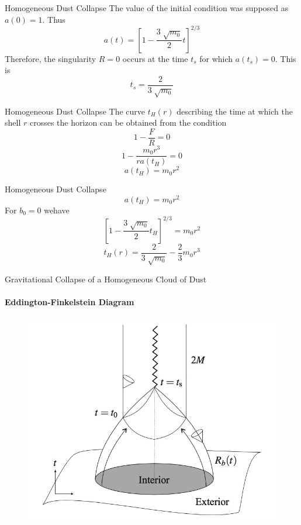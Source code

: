 \documentclass{beamer}
\begin{document}
\begin{darkframes}
\begin{frame}{Homogeneous Dust Collapse}
    The value of the initial condition was supposed as $a(0)=1$. Thus
    $$a(t) = \left[ 1-\frac{3\sqrt[]{m_0}}{2}t \right]^{2/3}$$
    \pause
    Therefore, the singularity $ R=0 $ occurs at the time $t_s$ for which $a(t_s)=0$. This is
    $$t_s = \frac{2}{3\sqrt[]{m_0}}$$
\end{frame}

\begin{frame}{Homogeneous Dust Collapse}
    The curve $t_H (r)$ describing the time at which the shell $r$ crosses the  horizon can be obtained from the condition
    $$1-\frac{F}{R} = 0$$
    \pause
    $$1-\frac{m_0 r^3}{r a(t_H)} = 0$$
    \pause
    $$a(t_H)=m_0 r^2$$
\end{frame}

\begin{frame}{Homogeneous Dust Collapse}
    $$a(t_H)=m_0 r^2$$
    \pause
    For $b_0 = 0$ wehave
    $$ \left[ 1-\frac{3\sqrt[]{m_0}}{2}t_H \right]^{2/3} = m_0 r^2$$
    \pause
    $$t_H (r) = \frac{2}{3\sqrt[]{m_0}} - \frac{2}{3} m_0 r^3$$
\end{frame}

\end{darkframes}
\begin{frame}{Gravitational Collapse of a Homogeneous Cloud of Dust}
\framesubtitle{Eddington-Finkelstein Diagram}
	\begin{center}
      \begin{figure}
      	\includegraphics[scale=0.25] {figures/EFCollapse.jpeg}
      \end{figure}
	\end{center}	
\end{frame}
\end{document}

